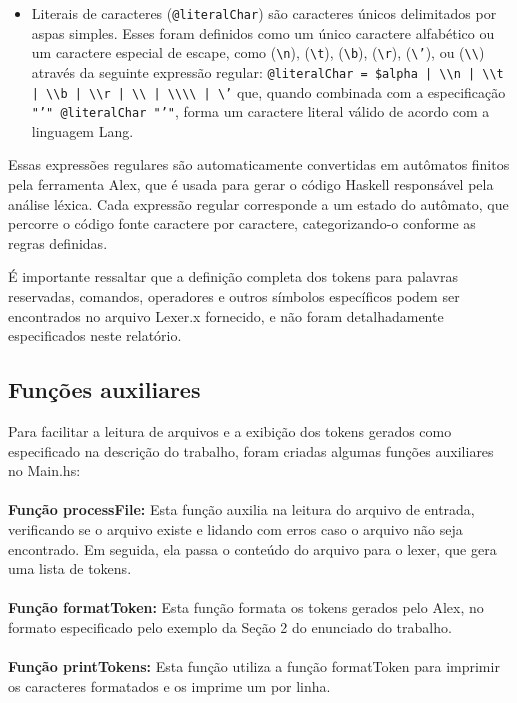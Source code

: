\documentclass{article}
\begin{document}
\begin{itemize}
    \item Literais de caracteres (\texttt{@literalChar}) são caracteres únicos delimitados por aspas simples. Esses foram definidos como um único caractere alfabético ou um caractere especial de escape, como (\texttt{\textbackslash n}), (\texttt{\textbackslash t}), (\texttt{\textbackslash b}), (\texttt{\textbackslash r}), (\texttt{\textbackslash '}), ou (\texttt{\textbackslash\textbackslash}) através da seguinte expressão regular: \texttt{@literalChar = \$alpha | \textbackslash{}\textbackslash{}n | \textbackslash{}\textbackslash{}t | \textbackslash{}\textbackslash{}b | \textbackslash{}\textbackslash{}r | \textbackslash{}\textbackslash{} | \textbackslash{}\textbackslash{}\textbackslash{}\textbackslash{} | \textbackslash{}'} que, quando combinada com a especificação \texttt{"'" @literalChar "'"}, forma um caractere literal válido de acordo com a linguagem Lang.
\end{itemize}

Essas expressões regulares são automaticamente convertidas em autômatos finitos pela ferramenta Alex, que é usada para gerar o código Haskell responsável pela análise léxica. Cada expressão regular corresponde a um estado do autômato, que percorre o código fonte caractere por caractere, categorizando-o conforme as regras definidas.

É importante ressaltar que a definição completa dos tokens para palavras reservadas, comandos, operadores e outros símbolos específicos podem ser encontrados no arquivo Lexer.x fornecido, e não foram detalhadamente especificados neste relatório.

\subsection{Funções auxiliares}
Para facilitar a leitura de arquivos e a exibição dos tokens gerados como especificado na descrição do trabalho, foram criadas algumas funções auxiliares no Main.hs:
\\\\
\textbf{Função processFile:} Esta função auxilia na leitura do arquivo de entrada, verificando se o arquivo existe e lidando com erros caso o arquivo não seja encontrado. Em seguida, ela passa o conteúdo do arquivo para o lexer, que gera uma lista de tokens.
\\\\
\textbf{Função formatToken:} Esta função formata os tokens gerados pelo Alex, no formato especificado pelo exemplo da Seção 2 do enunciado do trabalho.
\\\\
\textbf{Função printTokens:} Esta função utiliza a função formatToken para imprimir os caracteres formatados e os imprime um por linha.
\end{document}
